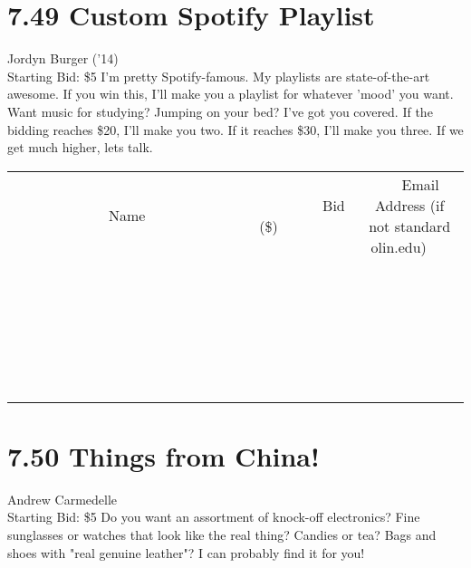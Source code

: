 \documentclass[11pt]{article}
\begin{document}
\section*{7.49 Custom Spotify Playlist}
Jordyn Burger ('14)
\\
Starting Bid: \$5
\newline
I'm pretty Spotify-famous. My playlists are state-of-the-art awesome. If you win this, I'll make you a playlist for whatever 'mood' you want. Want music for studying? Jumping on your bed? I've got you covered. If the bidding reaches \$20, I'll make you two. If it reaches \$30, I'll make you three. If we get much higher, lets talk.
\\[6ex]
\begin{tabular}{c c c}
~~~~~~~~~~~~~Name~~~~~~~~~~~~~ & ~~~~~~~~~Bid (\$)~~~~~~~~~  & ~~~Email Address (if not standard olin.edu)~~~\\
 & & \\
\hline
 & & \\
\hline
 & & \\
\hline
 & & \\
\hline
 & & \\
\hline
 & & \\
\hline
 & & \\
\hline
 & & \\
\hline
 & & \\
\hline
 & & \\
\hline
 & & \\
\hline
 & & \\
\hline
 & & \\
\hline
 & & \\
\hline
 & & \\
\hline
 & & \\
\hline
 & & \\
\hline
 & & \\
\hline
 & & \\
\hline
 & & \\
\hline
 & & \\
\hline
 & & \\
\hline
 & & \\
\hline
 & & \\
\hline
 & & \\
\hline
 & & \\
\hline
\end{tabular}
\newpage
\section*{7.50 Things from China!}
Andrew Carmedelle
\\
Starting Bid: \$5
\newline
Do you want an assortment of knock-off electronics? Fine sunglasses or watches that look like the real thing? Candies or tea? Bags and shoes with "real genuine leather"? I can probably find it for you!
\end{document}
